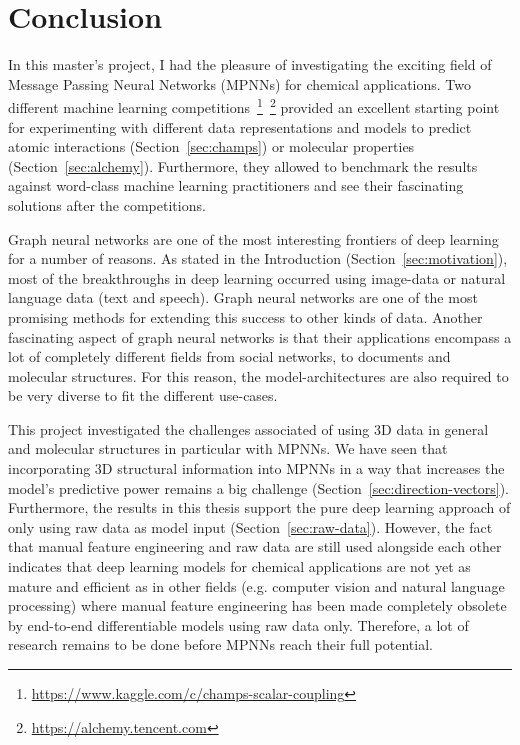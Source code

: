 \chapter{Conclusion}
\label{chapter:Conclusion}

In this master's project, I had the pleasure of investigating the exciting field of Message Passing Neural Networks (MPNNs) for chemical applications. Two different machine learning competitions~\footnote{\url{https://www.kaggle.com/c/champs-scalar-coupling}}~\footnote{\url{https://alchemy.tencent.com}} provided an excellent starting point for experimenting with different data representations and models to predict atomic interactions (Section~\ref{sec:champs}) or molecular properties (Section~\ref{sec:alchemy}). Furthermore, they allowed to benchmark the results against word-class machine learning practitioners and see their fascinating solutions after the competitions.

Graph neural networks are one of the most interesting frontiers of deep learning for a number of reasons. As stated in the Introduction (Section~\ref{sec:motivation}), most of the breakthroughs in deep learning occurred using image-data or natural language data (text and speech). Graph neural networks are one of the most promising methods for extending this success to other kinds of data. Another fascinating aspect of graph neural networks is that their applications encompass a lot of completely different fields from social networks, to documents and molecular structures. For this reason, the model-architectures are also required to be very diverse to fit the different use-cases.

This project investigated the challenges associated of using 3D data in general and molecular structures in particular with MPNNs. We have seen that incorporating 3D structural information into MPNNs in a way that increases the model's predictive power remains a big challenge (Section~\ref{sec:direction-vectors}). Furthermore, the results in this thesis support the pure deep learning approach of only using raw data as model input (Section~\ref{sec:raw-data}). However, the fact that manual feature engineering and raw data are still used alongside each other indicates that deep learning models for chemical applications are not yet as mature and efficient as in other fields (e.g. computer vision and natural language processing) where manual feature engineering has been made completely obsolete by end-to-end differentiable models using raw data only. Therefore, a lot of research remains to be done before MPNNs reach their full potential.

